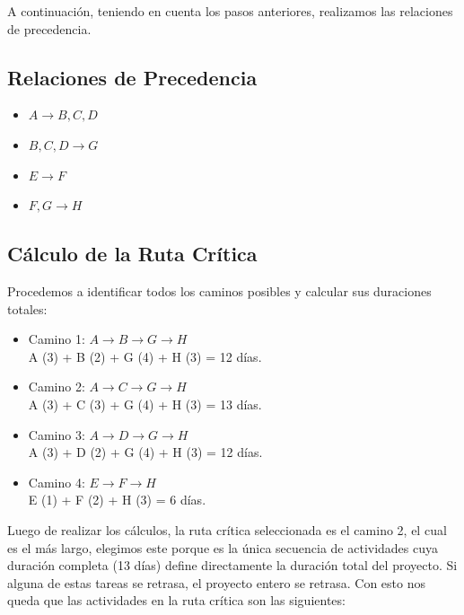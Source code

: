 \documentclass[letterpaper, 11pt]{report}
\begin{document}
A continuación, teniendo en cuenta los pasos anteriores, realizamos las
relaciones de precedencia.

\subsection{Relaciones de Precedencia}

\begin{itemize}[label=$\triangleright$]
      \item  $A \rightarrow B, C, D$
      \item  $B, C, D \rightarrow G$
      \item  $E \rightarrow F$
      \item  $F, G \rightarrow H$

\end{itemize}

\subsection{Cálculo de la Ruta Crítica}

Procedemos a identificar todos los caminos posibles y calcular sus duraciones
totales:

\begin{itemize}
      \item Camino 1: $A \rightarrow B \rightarrow G \rightarrow H$ \\ A (3) + B (2) + G
            (4) + H (3) = 12 días.

      \item Camino 2: $A \rightarrow C \rightarrow G \rightarrow H$ \\ A (3) + C (3) + G
            (4) + H (3) = 13 días.

      \item Camino 3: $A \rightarrow D \rightarrow G \rightarrow H$ \\ A (3) + D (2) + G
            (4) + H (3) = 12 días.

      \item Camino 4: $E \rightarrow F \rightarrow H$ \\ E (1) + F (2) + H (3) = 6 días.
\end{itemize}

Luego de realizar los cálculos, la ruta crítica seleccionada es el camino 2, el
cual es el más largo, elegimos este porque es la única secuencia de actividades
cuya duración completa (13 días) define directamente la duración total del
proyecto. Si alguna de estas tareas se retrasa, el proyecto entero se retrasa.
Con esto nos queda que las actividades en la ruta crítica son las siguientes:
\end{document}

